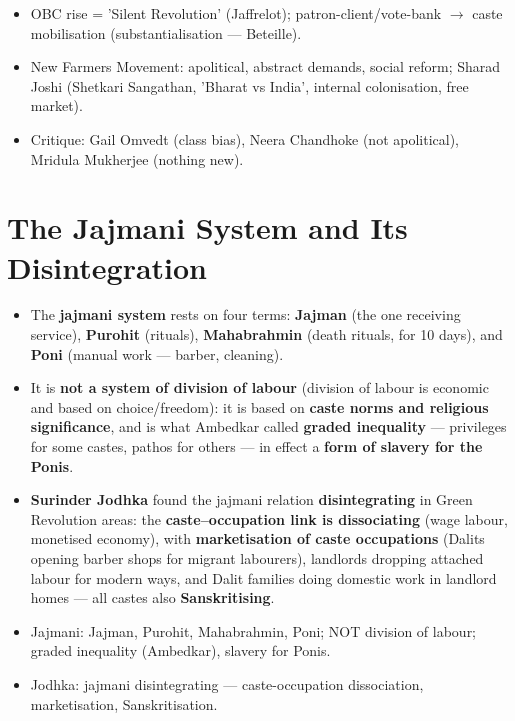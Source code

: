 \begin{QuickRevision}
\begin{itemize}
\item OBC rise = 'Silent Revolution' (Jaffrelot); patron-client/vote-bank $\rightarrow$ caste mobilisation (substantialisation --- Beteille).
\item New Farmers Movement: apolitical, abstract demands, social reform; Sharad Joshi (Shetkari Sangathan, 'Bharat vs India', internal colonisation, free market).
\item Critique: Gail Omvedt (class bias), Neera Chandhoke (not apolitical), Mridula Mukherjee (nothing new).
\end{itemize}
\end{QuickRevision}

\section{The Jajmani System and Its Disintegration}

\begin{KeyConcept}
\begin{itemize}
\item The \textbf{jajmani system} rests on four terms: \textbf{Jajman} (the one receiving service), \textbf{Purohit} (rituals), \textbf{Mahabrahmin} (death rituals, for 10 days), and \textbf{Poni} (manual work --- barber, cleaning).
\item It is \textbf{not a system of division of labour} (division of labour is economic and based on choice/freedom): it is based on \textbf{caste norms and religious significance}, and is what Ambedkar called \textbf{graded inequality} --- privileges for some castes, pathos for others --- in effect a \textbf{form of slavery for the Ponis}.
\item \textbf{Surinder Jodhka} found the jajmani relation \textbf{disintegrating} in Green Revolution areas: the \textbf{caste--occupation link is dissociating} (wage labour, monetised economy), with \textbf{marketisation of caste occupations} (Dalits opening barber shops for migrant labourers), landlords dropping attached labour for modern ways, and Dalit families doing domestic work in landlord homes --- all castes also \textbf{Sanskritising}.
\end{itemize}
\end{KeyConcept}

\begin{QuickRevision}
\begin{itemize}
\item Jajmani: Jajman, Purohit, Mahabrahmin, Poni; NOT division of labour; graded inequality (Ambedkar), slavery for Ponis.
\item Jodhka: jajmani disintegrating --- caste-occupation dissociation, marketisation, Sanskritisation.
\end{itemize}
\end{QuickRevision}

